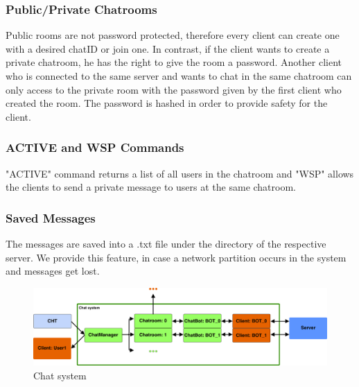 \subsubsection{Public/Private Chatrooms}
\label{sec:groupchat_funtionalities_chatrooms}
Public rooms are not password protected, therefore every client can create one with a desired chatID or join one. In contrast, if the client wants to create a private chatroom, he has the right to give the room a password. Another client who is connected to the same server and wants to chat in the same chatroom can only access to the private room with the password given by the first client who created the room. The password is hashed in order to provide safety for the client.

\subsubsection{ACTIVE and WSP Commands}
\label{sec:groupchat_funtionalities_commands}
"ACTIVE" command returns a list of all users in the chatroom and "WSP" allows the clients to send a private message to users at the same chatroom.

\subsubsection{Saved Messages}
\label{sec:groupchat_funtionalities_savedmessages}
The messages are saved into a .txt file under the directory of the respective server. We provide this feature, in case a network partition occurs in the system and messages get lost.

\begin{figure}[h]
	\centering
	\includegraphics[width=\linewidth]{figures/chat/chat_arch.png}
	\caption{Chat system}
\end{figure}


